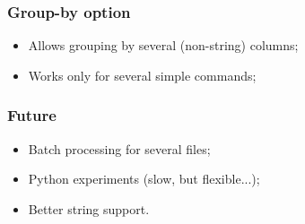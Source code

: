 \documentclass[14pt]{beamer}
\begin{document}
\begin{frame}
 \frametitle{Group-by option}
\begin{itemize}
 \item Allows grouping by several (non-string) columns;
 \item Works only for several simple commands;
\end{itemize}

\end{frame}

\begin{frame}
 \frametitle{Future}
\begin{itemize}
 \item Batch processing for several files;
 \item Python experiments (slow, but flexible...);
 \item Better string support.
\end{itemize}

\end{frame}
\end{document}
